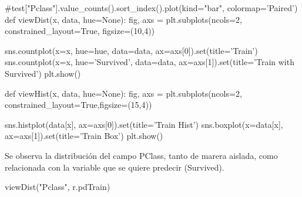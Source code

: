 \documentclass[
]{article}
\newenvironment{Shaded}{\begin{snugshade}}{\end{snugshade}}
\newcommand{\BuiltInTok}[1]{\textcolor[rgb]{0.80,0.80,0.80}{#1}}
\newcommand{\CommentTok}[1]{\textcolor[rgb]{0.50,0.62,0.50}{#1}}
\newcommand{\DecValTok}[1]{\textcolor[rgb]{0.86,0.86,0.80}{#1}}
\newcommand{\KeywordTok}[1]{\textcolor[rgb]{0.94,0.87,0.69}{#1}}
\newcommand{\NormalTok}[1]{\textcolor[rgb]{0.80,0.80,0.80}{#1}}
\newcommand{\OperatorTok}[1]{\textcolor[rgb]{0.94,0.94,0.82}{#1}}
\newcommand{\StringTok}[1]{\textcolor[rgb]{0.80,0.58,0.58}{#1}}
\newcommand{\VariableTok}[1]{\textcolor[rgb]{0.80,0.80,0.80}{#1}}
\begin{document}
\begin{Shaded}
\begin{Highlighting}[]
\CommentTok{#test["Pclass"].value_counts().sort_index().plot(kind="bar", colormap='Paired')}
\KeywordTok{def}\NormalTok{ viewDist(x, data, hue}\OperatorTok{=}\VariableTok{None}\NormalTok{):}
\NormalTok{    fig, axs }\OperatorTok{=}\NormalTok{ plt.subplots(ncols}\OperatorTok{=}\DecValTok{2}\NormalTok{, constrained_layout}\OperatorTok{=}\VariableTok{True}\NormalTok{, figsize}\OperatorTok{=}\NormalTok{(}\DecValTok{10}\NormalTok{,}\DecValTok{4}\NormalTok{))}

\NormalTok{    sns.countplot(x}\OperatorTok{=}\NormalTok{x, hue}\OperatorTok{=}\NormalTok{hue, data}\OperatorTok{=}\NormalTok{data, ax}\OperatorTok{=}\NormalTok{axs[}\DecValTok{0}\NormalTok{]).}\BuiltInTok{set}\NormalTok{(title}\OperatorTok{=}\StringTok{'Train'}\NormalTok{)}
\NormalTok{    sns.countplot(x}\OperatorTok{=}\NormalTok{x, hue}\OperatorTok{=}\StringTok{'Survived'}\NormalTok{, data}\OperatorTok{=}\NormalTok{data, ax}\OperatorTok{=}\NormalTok{axs[}\DecValTok{1}\NormalTok{]).}\BuiltInTok{set}\NormalTok{(title}\OperatorTok{=}\StringTok{'Train with Survived'}\NormalTok{)}
\NormalTok{    plt.show()}

\KeywordTok{def}\NormalTok{ viewHist(x, data, hue}\OperatorTok{=}\VariableTok{None}\NormalTok{):}
\NormalTok{    fig, axs }\OperatorTok{=}\NormalTok{ plt.subplots(ncols}\OperatorTok{=}\DecValTok{2}\NormalTok{, constrained_layout}\OperatorTok{=}\VariableTok{True}\NormalTok{,figsize}\OperatorTok{=}\NormalTok{(}\DecValTok{15}\NormalTok{,}\DecValTok{4}\NormalTok{))}
    
\NormalTok{    sns.histplot(data[x], ax}\OperatorTok{=}\NormalTok{axs[}\DecValTok{0}\NormalTok{]).}\BuiltInTok{set}\NormalTok{(title}\OperatorTok{=}\StringTok{'Train Hist'}\NormalTok{)}
\NormalTok{    sns.boxplot(x}\OperatorTok{=}\NormalTok{data[x], ax}\OperatorTok{=}\NormalTok{axs[}\DecValTok{1}\NormalTok{]).}\BuiltInTok{set}\NormalTok{(title}\OperatorTok{=}\StringTok{'Train Box'}\NormalTok{)}
\NormalTok{    plt.show()}
\end{Highlighting}
\end{Shaded}

Se observa la distribución del campo PClass, tanto de marera aislada,
como relacionada con la variable que se quiere predecir (Survived).

\begin{Shaded}
\begin{Highlighting}[]
\NormalTok{viewDist(}\StringTok{"Pclass"}\NormalTok{, r.pdTrain)}
\end{Highlighting}
\end{Shaded}
\end{document}
